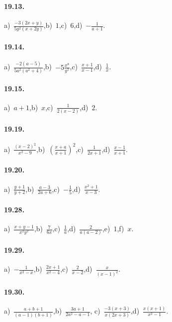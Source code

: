 \paragraph{19.13.}
a)~$\frac{-{3(2x+y)}}{5y^{2}(x+2y)}$,\quad b)~$1$,\quad c)~$6$,\quad d)~$-{\frac{1}{a+1}}$.

\paragraph{19.14.}
a)~$\frac{-{2(a-5)}}{5a^{2}(a^{2}+4)}$,\quad b)~$-5\frac{x^{8}}{y^{5}}$,\quad c)~$\frac{x+1}{x-1}$,\quad d)~$\frac{1}{x}$.

\paragraph{19.15.}
a)~$a+1$,\quad b)~$x$,\quad c)~$\frac{1}{2(x-2)}$,\quad d)~$2$.

\paragraph{19.19.}
a)~$\frac{(x-2)^{2}}{x^{2}-9}$,\quad b)~$\left(\frac{x+a}{x+1}\right)^{2}$,\quad c)~$\frac{1}{2x+1}$,\quad d)~$\frac{x-1}{x+1}$.

\paragraph{19.20.}
a)~$\frac{y+1}{y+2}$,\quad b)~$\frac{a-3}{2a+6}$,\quad c)~$-{\frac{1}{5}}$,\quad d)~$\frac{x^{2}+1}{x-3}$.

\paragraph{19.28.}
a)~$\frac{x+y-1}{x^{2}y^{2}}$,\quad b)~$\frac{7}{6x}$,\quad c)~$\frac{1}{a}$,\quad d)~$\frac{2}{a(a-2)}$,\quad e)~$1$,\quad f)~$x$.

\paragraph{19.29.}
a)~$-{\frac{1}{x^{2}-x}}$,\quad b)~$\frac{2x+1}{x^{2}-4}$,\quad c)~$\frac{2}{x-2}$,\quad d)~$\frac{x}{(x-1)^{2}}$.

\paragraph{19.30.}
a)~$\frac{a+b+1}{(a-1)(b+1)}$,\quad b)~$\frac{3a+1}{2a^{2}-a-1}$, \quad c)~$\frac{-3(x+3)}{x(2x+3)}$,\quad d)~$\frac{x(x+1)}{x^{3}-1}$.

